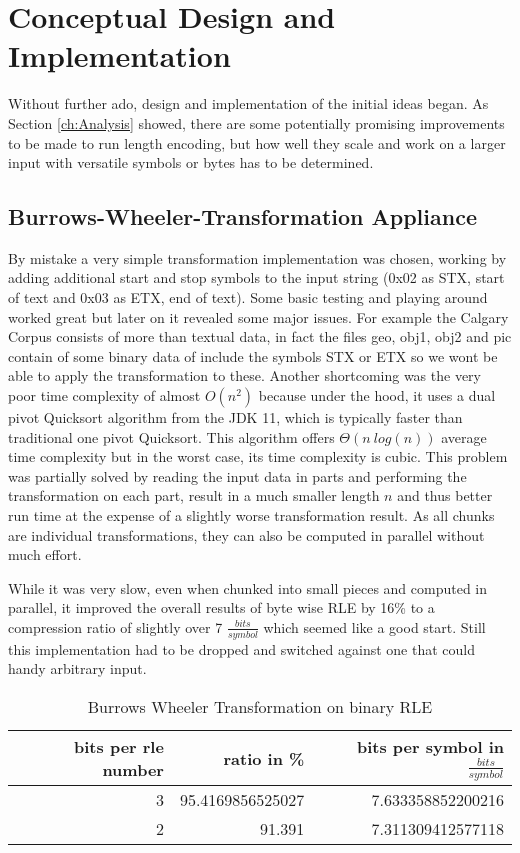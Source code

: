 
\chapter{Conceptual Design and Implementation}
\label{ch:Conceptual Design}
\par{
Without further ado, design and implementation of the initial ideas began. As Section \ref{ch:Analysis} showed, there are some potentially promising improvements to be made to run length encoding, but how well they scale and work on a larger input with versatile symbols or bytes has to be determined.
}

\section{Burrows-Wheeler-Transformation Appliance}
\par{
By mistake a very simple transformation implementation was chosen, working by adding additional start and stop symbols to the input string (0x02 as STX, start of text and 0x03 as ETX, end of text). Some basic testing and playing around worked great but later on it revealed some major issues. For example the Calgary Corpus consists of more than textual data, in fact the files geo, obj1, obj2 and pic contain of some binary data of include the symbols STX or ETX so we wont be able to apply the transformation to these. Another shortcoming was the very poor time complexity of almost $O (n^2)$ because under the hood, it uses a dual pivot Quicksort algorithm from the JDK 11, which is typically faster than traditional one pivot Quicksort. This algorithm offers $\Theta (n \: log(n))$ average time complexity but in the worst case, its time complexity is cubic. This problem was partially solved by reading the input data in parts and performing the transformation on each part, result in a much smaller length $n$ and thus better run time at the expense of a slightly worse transformation result. As all chunks are individual transformations, they can also be computed in parallel without much effort.
}

\par{
While it was very slow, even when chunked into small pieces and computed in parallel, it improved the overall results of byte wise RLE by 16\% to a compression ratio of slightly over 7 $\frac{bits}{symbol}$ which seemed like a good start. Still this implementation had to be dropped and switched against one that could handy arbitrary input.

\begin{table}[h]
	\centering
	\begin{tabular}{r|r|r}	
		bits per rle number & ratio in \% & bits per symbol in $\frac{bits}{symbol}$\\
		\hline
		3 & 95.4169856525027 & 7.633358852200216\\
		2 & 91.391 & 7.311309412577118 \\
	\end{tabular}
	\caption{Burrows Wheeler Transformation on binary RLE}
	\label{tab:t7 rle vertical reading}
\end{table}
}

